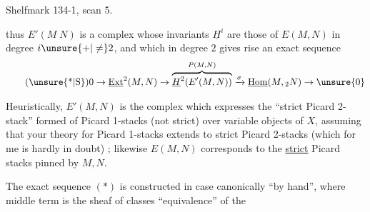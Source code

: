 Shelfmark 134-1, scan 5.

\margin{\mbox{-- --}}

thus $E'(M\;N)$ is a complex whose invariants $\underline{H}^{i}$ are those of $E(M,N)$ in degree $i\unsure{+|\ne}2$, and which in degree $2$ gives rise  an exact sequence
\begingroup
\makeatletter\tagsleft@true\makeatother
\[
\tag*{(\unsure{*|S})}
0\to\underline{\mathrm{Ext}}^{2}(M,N)\to
\overbrace{\underline{H}^{2}\!\left(E'(M,N)\right)}^{P(M,N)}
\xrightarrow{\sigma}\underline{\mathrm{Hom}}(M,{}_{2}N)\to \unsure{0}
\]
\endgroup

Heuristically, $E'(M,N)$ is the complex which expresses the ``strict Picard 2-stack'' formed of Picard 1-stacks (not  strict)  over variable objects of $X$, assuming that your theory for  Picard 1-stacks extends to strict Picard 2-stacks (which for me is hardly in doubt) ; likewise $E(M,N)$ corresponds to the \uline{strict} Picard stacks pinned by $M,N$.

The exact sequence $(*)$ is constructed in  case canonically ``by hand'', where  middle term is the sheaf of classes  ``equivalence'' of the

